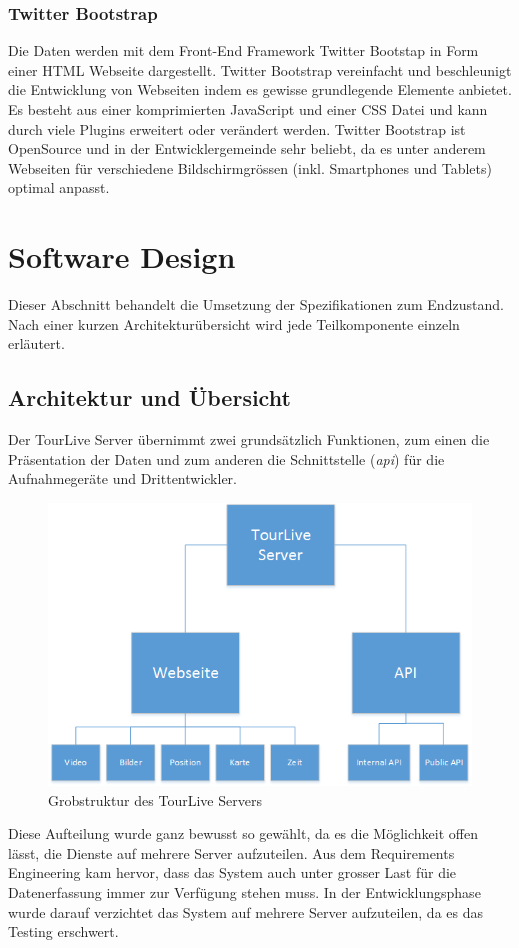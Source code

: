 \subsubsection{Twitter Bootstrap}
Die Daten werden mit dem Front-End Framework Twitter Bootstap in Form einer HTML Webseite dargestellt. Twitter Bootstrap vereinfacht und beschleunigt die Entwicklung von Webseiten indem es gewisse grundlegende Elemente anbietet. Es besteht aus einer komprimierten JavaScript und einer CSS Datei und kann durch viele Plugins erweitert oder verändert werden. Twitter Bootstrap ist OpenSource und in der Entwicklergemeinde sehr beliebt, da es unter anderem Webseiten für verschiedene Bildschirmgrössen (inkl. Smartphones und Tablets) optimal anpasst.

\section{Software Design}
Dieser Abschnitt behandelt die Umsetzung der Spezifikationen zum Endzustand. Nach einer kurzen Architekturübersicht wird jede Teilkomponente einzeln erläutert.

\subsection{Architektur und Übersicht}
Der TourLive Server übernimmt zwei grundsätzlich Funktionen, zum einen die Präsentation der Daten und zum anderen die Schnittstelle (\textit{\gls{api}}) für die Aufnahmegeräte und Drittentwickler.
\begin{figure}[H]
	\centering
	\includegraphics[width=130mm]{images/tourliveweb/uebersicht_tourlive.png}
	\caption{Grobstruktur des TourLive Servers}
	\label{fig:grobstrukturtourliveserver}
\end{figure}
Diese Aufteilung wurde ganz bewusst so gewählt, da es die Möglichkeit offen lässt, die Dienste auf mehrere Server aufzuteilen. Aus dem Requirements Engineering kam hervor, dass das System auch unter grosser Last für die Datenerfassung immer zur Verfügung stehen muss. In der Entwicklungsphase wurde darauf verzichtet das System auf mehrere Server aufzuteilen, da es das Testing erschwert.

